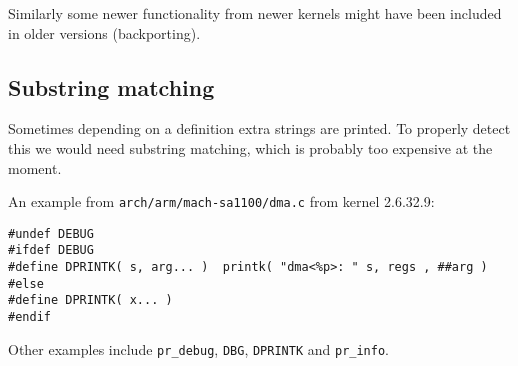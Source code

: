 \documentclass[10pt]{article}
\begin{document}
Similarly some newer functionality from newer kernels might have been included
in older versions (backporting).

\subsection{Substring matching}

Sometimes depending on a definition extra strings are printed. To properly detect this we would need substring matching, which is probably too expensive at the moment.

An example from \texttt{arch/arm/mach-sa1100/dma.c} from kernel 2.6.32.9:

\begin{verbatim}
#undef DEBUG
#ifdef DEBUG
#define DPRINTK( s, arg... )  printk( "dma<%p>: " s, regs , ##arg )
#else
#define DPRINTK( x... )
#endif
\end{verbatim}

Other examples include \texttt{pr\_debug}, \texttt{DBG}, \texttt{DPRINTK} and
\texttt{pr\_info}.
\end{document}
